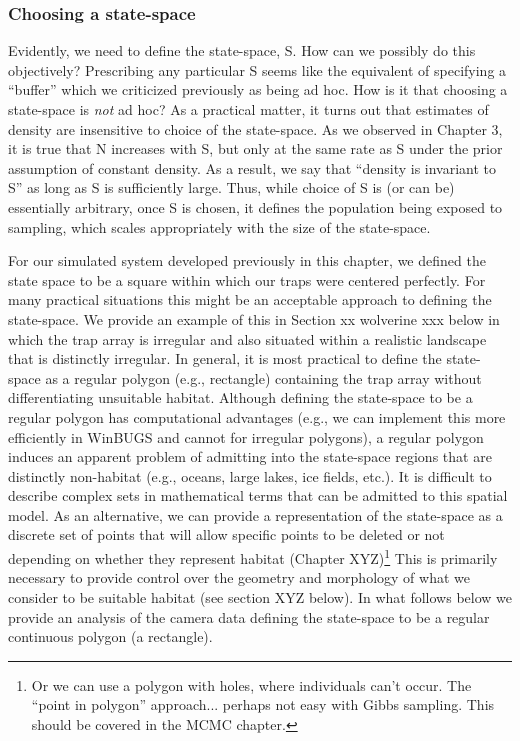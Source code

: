 \subsubsection{Choosing a state-space}

 Evidently, we need to define the state-space, S. How can we possibly do this objectively? Prescribing any particular S seems like the equivalent of specifying a ``buffer'' which we criticized previously as being ad hoc. How is it that choosing a state-space is {\it not} ad hoc? As a practical matter, it turns out that estimates of density are insensitive to choice of the state-space. As we observed in Chapter 3, it is true that N increases with S, but only at the same rate as S under the prior assumption of constant density. As a result, we say that ``density is invariant to S'' as long as S is sufficiently large. Thus, while choice of S is (or can be) essentially arbitrary, once S is chosen, it defines the population being exposed to sampling, which scales appropriately with the size of the state-space.  

For our simulated system developed previously in this chapter, we defined the state space to be a square within which our traps were centered perfectly. For many practical situations this might be an acceptable approach to defining the state-space. We provide an example of this in Section xx wolverine xxx below in which the trap array is irregular and also situated within a realistic landscape that is distinctly irregular.  
In general, it is most practical to define the state-space as a regular polygon (e.g., rectangle) containing the trap array without differentiating unsuitable habitat. Although defining the state-space to be a regular polygon has computational advantages (e.g., we can implement this more efficiently in WinBUGS and cannot for irregular polygons), a regular polygon induces an apparent problem of admitting into the state-space regions that are distinctly non-habitat (e.g., oceans, large lakes, ice fields, etc.).  It is difficult to describe complex sets in mathematical terms that can be admitted to this spatial model. As an alternative, we can provide a representation of the state-space as a discrete set of points that will allow specific points to be deleted or not depending on whether they represent habitat (Chapter XYZ)\footnote{ Or we can use a polygon with holes, where individuals can't occur. The ``point in polygon'' approach... perhaps not easy with Gibbs sampling.
This should be covered in the MCMC chapter.}
This is primarily necessary to provide control over the geometry and morphology of what we consider to be suitable habitat (see section XYZ below). In what follows below we provide an analysis of the camera data defining the state-space to be a regular continuous polygon (a rectangle).


